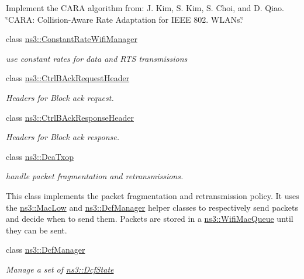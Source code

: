 \begin{DoxyCompactItemize}
\begin{DoxyCompactList}
Implement the C\+A\+RA algorithm from\+: J. Kim, S. Kim, S. Choi, and D. Qiao. \char`\"{}\+C\+A\+R\+A\+: Collision-\/\+Aware Rate Adaptation for I\+E\+E\+E 802. W\+L\+A\+Ns.\char`\"{} \end{DoxyCompactList}\item 
class \hyperlink{classns3_1_1ConstantRateWifiManager}{ns3\+::\+Constant\+Rate\+Wifi\+Manager}
\begin{DoxyCompactList}\small\item\em use constant rates for data and R\+TS transmissions \end{DoxyCompactList}\item 
class \hyperlink{classns3_1_1CtrlBAckRequestHeader}{ns3\+::\+Ctrl\+B\+Ack\+Request\+Header}
\begin{DoxyCompactList}\small\item\em Headers for Block ack request. \end{DoxyCompactList}\item 
class \hyperlink{classns3_1_1CtrlBAckResponseHeader}{ns3\+::\+Ctrl\+B\+Ack\+Response\+Header}
\begin{DoxyCompactList}\small\item\em Headers for Block ack response. \end{DoxyCompactList}\item 
class \hyperlink{classns3_1_1DcaTxop}{ns3\+::\+Dca\+Txop}
\begin{DoxyCompactList}\small\item\em handle packet fragmentation and retransmissions.

This class implements the packet fragmentation and retransmission policy. It uses the \hyperlink{classns3_1_1MacLow}{ns3\+::\+Mac\+Low} and \hyperlink{classns3_1_1DcfManager}{ns3\+::\+Dcf\+Manager} helper classes to respectively send packets and decide when to send them. Packets are stored in a \hyperlink{namespacens3_a3ca96bcdf02c0e7cacea08ca62ead54c}{ns3\+::\+Wifi\+Mac\+Queue} until they can be sent. \end{DoxyCompactList}\item 
class \hyperlink{classns3_1_1DcfManager}{ns3\+::\+Dcf\+Manager}
\begin{DoxyCompactList}\small\item\em Manage a set of \hyperlink{classns3_1_1DcfState}{ns3\+::\+Dcf\+State}


\end{DoxyCompactList}
\end{DoxyCompactItemize}
